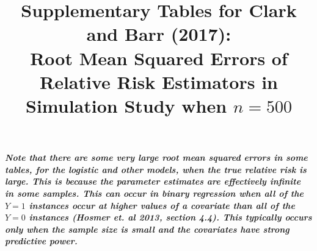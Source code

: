 \documentclass[12pt,a4paper]{article}
\date{}
\begin{document}
\title{Supplementary Tables for Clark and Barr (2017):  \\  
Root Mean Squared Errors of Relative Risk Estimators in Simulation Study when $n=500$ }


\maketitle



{\bf \it Note that there are some very large root mean squared errors in some tables, for the logistic and other models, when the true relative risk is large. This is because the parameter estimates are effectively infinite in some samples. This can occur in binary regression when all of the $Y=1$ instances occur at higher values of a covariate than all of the $Y=0$ instances (Hosmer et. al 2013, section 4.4). This typically occurs only when the sample size is small and the covariates have strong predictive power.}
\end{document}
